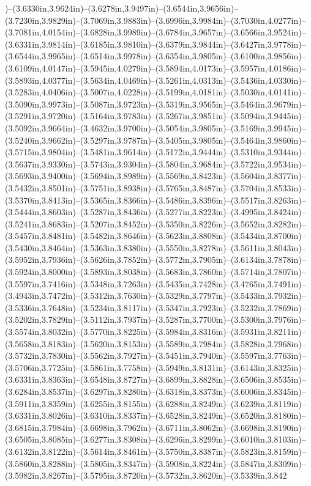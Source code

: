 )--(3.6330in,3.9624in)--(3.6278in,3.9497in)--(3.6544in,3.9656in)--(3.7230in,3.9829in)--(3.7069in,3.9883in)--(3.6996in,3.9984in)--(3.7030in,4.0277in)--(3.7081in,4.0154in)--(3.6828in,3.9989in)--(3.6784in,3.9657in)--(3.6566in,3.9524in)--(3.6331in,3.9814in)--(3.6185in,3.9810in)--(3.6379in,3.9844in)--(3.6427in,3.9778in)--(3.6544in,3.9965in)--(3.6514in,3.9978in)--(3.6354in,3.9805in)--(3.6100in,3.9856in)--(3.6109in,4.0147in)--(3.5945in,4.0279in)--(3.5894in,4.0173in)--(3.5957in,4.0186in)--(3.5893in,4.0377in)--(3.5634in,4.0469in)--(3.5261in,4.0313in)--(3.5436in,4.0330in)--(3.5283in,4.0406in)--(3.5007in,4.0228in)--(3.5199in,4.0181in)--(3.5030in,4.0141in)--(3.5090in,3.9973in)--(3.5087in,3.9723in)--(3.5319in,3.9565in)--(3.5464in,3.9679in)--(3.5291in,3.9720in)--(3.5164in,3.9783in)--(3.5267in,3.9851in)--(3.5094in,3.9445in)--(3.5092in,3.9664in)--(3.4632in,3.9700in)--(3.5054in,3.9805in)--(3.5169in,3.9945in)--(3.5240in,3.9662in)--(3.5297in,3.9787in)--(3.5405in,3.9805in)--(3.5464in,3.9860in)--(3.5715in,3.9804in)--(3.5481in,3.9614in)--(3.5172in,3.9444in)--(3.5310in,3.9344in)--(3.5637in,3.9330in)--(3.5743in,3.9304in)--(3.5804in,3.9684in)--(3.5722in,3.9534in)--(3.5693in,3.9400in)--(3.5694in,3.8989in)--(3.5569in,3.8423in)--(3.5604in,3.8377in)--(3.5432in,3.8501in)--(3.5751in,3.8938in)--(3.5765in,3.8487in)--(3.5704in,3.8533in)--(3.5370in,3.8413in)--(3.5365in,3.8366in)--(3.5486in,3.8396in)--(3.5517in,3.8263in)--(3.5444in,3.8603in)--(3.5287in,3.8436in)--(3.5277in,3.8223in)--(3.4995in,3.8424in)--(3.5241in,3.8683in)--(3.5207in,3.8452in)--(3.5350in,3.8226in)--(3.5652in,3.8282in)--(3.5457in,3.8481in)--(3.5482in,3.8646in)--(3.5623in,3.8808in)--(3.5434in,3.8700in)--(3.5430in,3.8464in)--(3.5363in,3.8380in)--(3.5550in,3.8278in)--(3.5611in,3.8043in)--(3.5952in,3.7936in)--(3.5626in,3.7852in)--(3.5772in,3.7905in)--(3.6134in,3.7878in)--(3.5924in,3.8000in)--(3.5893in,3.8038in)--(3.5683in,3.7860in)--(3.5714in,3.7807in)--(3.5597in,3.7416in)--(3.5348in,3.7263in)--(3.5435in,3.7428in)--(3.4765in,3.7491in)--(3.4943in,3.7472in)--(3.5312in,3.7630in)--(3.5329in,3.7797in)--(3.5433in,3.7932in)--(3.5336in,3.7648in)--(3.5234in,3.8117in)--(3.5347in,3.7923in)--(3.5232in,3.7869in)--(3.5202in,3.7829in)--(3.5112in,3.7937in)--(3.5287in,3.7700in)--(3.5300in,3.7976in)--(3.5574in,3.8032in)--(3.5770in,3.8225in)--(3.5984in,3.8316in)--(3.5931in,3.8211in)--(3.5658in,3.8183in)--(3.5620in,3.8153in)--(3.5589in,3.7984in)--(3.5828in,3.7968in)--(3.5732in,3.7830in)--(3.5562in,3.7927in)--(3.5451in,3.7940in)--(3.5597in,3.7763in)--(3.5706in,3.7725in)--(3.5861in,3.7758in)--(3.5949in,3.8131in)--(3.6143in,3.8325in)--(3.6331in,3.8363in)--(3.6548in,3.8727in)--(3.6899in,3.8828in)--(3.6506in,3.8535in)--(3.6284in,3.8537in)--(3.6297in,3.8280in)--(3.6318in,3.8373in)--(3.6006in,3.8345in)--(3.5911in,3.8359in)--(3.6255in,3.8155in)--(3.6288in,3.8249in)--(3.6239in,3.8119in)--(3.6331in,3.8026in)--(3.6310in,3.8337in)--(3.6528in,3.8249in)--(3.6520in,3.8180in)--(3.6815in,3.7984in)--(3.6698in,3.7962in)--(3.6711in,3.8062in)--(3.6698in,3.8190in)--(3.6505in,3.8085in)--(3.6277in,3.8308in)--(3.6296in,3.8299in)--(3.6010in,3.8103in)--(3.6132in,3.8122in)--(3.5614in,3.8461in)--(3.5750in,3.8387in)--(3.5823in,3.8159in)--(3.5860in,3.8288in)--(3.5805in,3.8347in)--(3.5908in,3.8224in)--(3.5847in,3.8309in)--(3.5982in,3.8267in)--(3.5795in,3.8720in)--(3.5732in,3.8620in)--(3.5339in,3.842